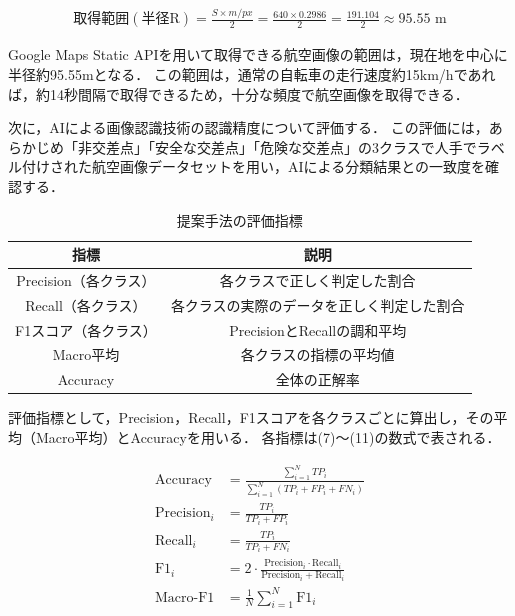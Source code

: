 \documentclass[uplatex,dvipdfmx]{jsarticle}
\begin{document}
\begin{align}
\mathrm{取得範囲(半径R)} = \frac{S\times m/px}{2} = \frac{640 \times 0.2986}{2} = \frac{191.104}{2} ≈ 95.55 \text{ m}
\end{align}

Google Maps Static APIを用いて取得できる航空画像の範囲は，現在地を中心に半径約95.55mとなる．
この範囲は，通常の自転車の走行速度約15km/hであれば，約14秒間隔で取得できるため，十分な頻度で航空画像を取得できる．

次に，AIによる画像認識技術の認識精度について評価する．
この評価には，あらかじめ「非交差点」「安全な交差点」「危険な交差点」の3クラスで人手でラベル付けされた航空画像データセットを用い，AIによる分類結果との一致度を確認する．

\begin{table}[H]
  \centering
  \caption{提案手法の評価指標}
  \label{tab:evaluation_metrics}
  \begin{tabular}{|c|c|}
    \hline
    指標 & 説明 \\ \hline
    Precision（各クラス） & 各クラスで正しく判定した割合 \\ \hline
    Recall（各クラス） & 各クラスの実際のデータを正しく判定した割合 \\ \hline
    F1スコア（各クラス） & PrecisionとRecallの調和平均 \\ \hline
    Macro平均 & 各クラスの指標の平均値 \\ \hline
    Accuracy & 全体の正解率 \\ \hline
  \end{tabular}
\end{table}

評価指標として，Precision，Recall，F1スコアを各クラスごとに算出し，その平均（Macro平均）とAccuracyを用いる．
各指標は(7)〜(11)の数式で表される．

\begin{align}
\mathrm{Accuracy} &= \frac{\sum_{i=1}^{N} TP_i}{\sum_{i=1}^{N} (TP_i + FP_i + FN_i)} \\
\mathrm{Precision}_i &= \frac{TP_i}{TP_i + FP_i} \\
\mathrm{Recall}_i &= \frac{TP_i}{TP_i + FN_i} \\
\mathrm{F1}_i &= 2 \cdot \frac{\mathrm{Precision}_i \cdot \mathrm{Recall}_i}{\mathrm{Precision}_i + \mathrm{Recall}_i} \\
\mathrm{Macro\text{-}F1} &= \frac{1}{N} \sum_{i=1}^{N} \mathrm{F1}_i
\end{align}
\end{document}
